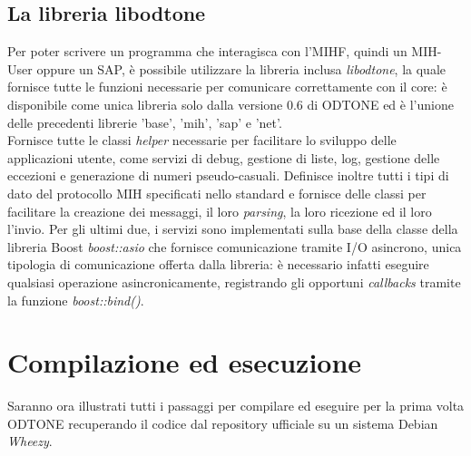 \subsection{La libreria libodtone}
Per poter scrivere un programma che interagisca con l'MIHF, quindi un MIH-User oppure un SAP, è possibile utilizzare la libreria inclusa {\em libodtone}, la quale fornisce tutte le funzioni necessarie per comunicare correttamente con il core: è disponibile come unica libreria solo dalla versione 0.6 di ODTONE ed è l'unione delle precedenti librerie 'base', 'mih', 'sap' e 'net'\cite{changelog}. \\
Fornisce tutte le classi {\em helper} necessarie per facilitare lo sviluppo delle applicazioni utente, come servizi di debug, gestione di liste, log, gestione delle eccezioni e generazione di numeri pseudo-casuali. Definisce inoltre tutti i tipi di dato del protocollo MIH specificati nello standard e fornisce delle classi per facilitare la creazione dei messaggi, il loro {\em parsing}, la loro ricezione ed il loro l'invio. Per gli ultimi due, i servizi sono implementati sulla base della classe della libreria Boost {\em boost::asio} che fornisce comunicazione tramite I/O asincrono, unica tipologia di comunicazione offerta dalla libreria: è necessario infatti eseguire qualsiasi operazione asincronicamente, registrando gli opportuni {\em callbacks} tramite la funzione {\em boost::bind()}.

\section{Compilazione ed esecuzione}
Saranno ora illustrati tutti i passaggi per compilare ed eseguire per la prima volta ODTONE recuperando il codice dal repository ufficiale su un sistema Debian\cite{debian} {\em Wheezy}.

